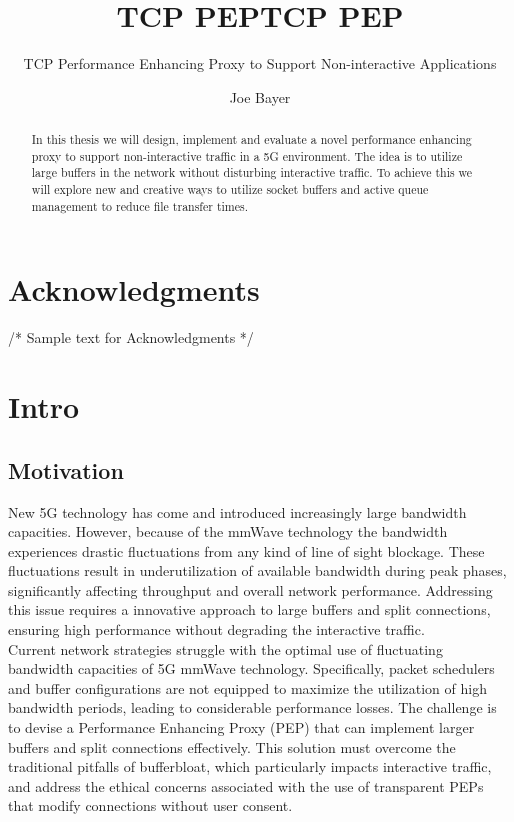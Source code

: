 \documentclass[a4paper,english, 11pt]{report}
\author{Joe Bayer}
\title{TCP PEP}
\subtitle{TCP Performance Enhancing Proxy to Support Non-interactive Applications}
\title{TCP PEP}
\begin{document}
\uiomasterfp[program={Informatics: Programming and System Architecture}, supervisors={Michael Welzl\and Kristjon Ciko}]
\tableofcontents


\listoffigures
{}

\begin{abstract}
In this thesis we will design, implement and evaluate a novel performance enhancing proxy to support non-interactive traffic in a 5G environment. The idea is to utilize large buffers in the network without disturbing interactive traffic. To achieve this we will explore new and creative ways to utilize socket buffers and active queue management to reduce file transfer times.
\end{abstract}

\chapter*{Acknowledgments}
\lipsum[1-2]  /* Sample text for Acknowledgments */

\chapter{Intro}

\section{Motivation}
New 5G technology has come and introduced increasingly large bandwidth capacities\cite{Agrawal_Sharma_2016}. However, because of the mmWave technology the bandwidth experiences drastic fluctuations from any kind of line of sight blockage\cite{mmwave_blocking}. These fluctuations result in underutilization of available bandwidth during peak phases, significantly affecting throughput and overall network performance. Addressing this issue requires a innovative approach to large buffers and split connections, ensuring high performance without degrading the interactive traffic.\\

Current network strategies struggle with the optimal use of fluctuating bandwidth capacities of 5G mmWave technology. Specifically, packet schedulers and buffer configurations are not equipped to maximize the utilization of high bandwidth periods, leading to considerable performance losses. The challenge is to devise a Performance Enhancing Proxy (PEP) that can implement larger buffers and split connections effectively. This solution must overcome the traditional pitfalls of bufferbloat, which particularly impacts interactive traffic, and address the ethical concerns associated with the use of transparent PEPs that modify connections without user consent.
\end{document}
